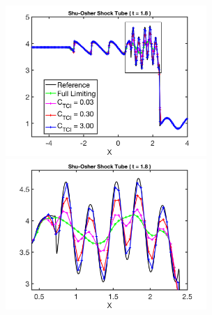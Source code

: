 \documentclass[letterpaper]{jpconf}
\begin{document}
\begin{figure}[h]
  \centering
  \begin{minipage}{18pc}
    \includegraphics[width=18pc]{./Figures/ShuOsher_Astronum_2018}
  \end{minipage}\hspace{0.5pc}%
  \begin{minipage}{18pc}
    \includegraphics[width=18pc]{./Figures/ShuOsher_Inset_Astronum_2018}
  \end{minipage} \\
  \begin{minipage}{12pc}

\end{minipage}
\end{figure}
\end{document}
